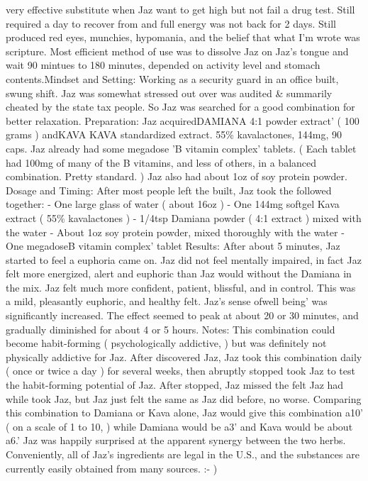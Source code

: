 \documentclass[12pt]{book}
\begin{document}
very effective substitute when Jaz want to get high but not fail a drug test. Still required a day to recover from and full energy was not back for 2 days. Still produced red eyes, munchies, hypomania, and the belief that what I'm wrote was scripture. Most efficient method of use was to dissolve Jaz on Jaz's tongue and wait 90 mintues to 180 minutes, depended on activity level and stomach contents.Mindset and Setting: Working as a security guard in an office built, swung shift. Jaz was somewhat stressed out over was audited \& summarily cheated by the state tax people. So Jaz was searched for a good combination for better relaxation. Preparation: Jaz acquiredDAMIANA 4:1 powder extract' ( 100 grams ) andKAVA KAVA standardized extract. 55\% kavalactones, 144mg, 90 caps. Jaz already had some megadose 'B vitamin complex' tablets. ( Each tablet had 100mg of many of the B vitamins, and less of others, in a balanced combination. Pretty standard. ) Jaz also had about 1oz of soy protein powder. Dosage and Timing: After most people left the built, Jaz took the followed together: - One large glass of water ( about 16oz ) - One 144mg softgel Kava extract ( 55\% kavalactones ) - 1/4tsp Damiana powder ( 4:1 extract ) mixed with the water - About 1oz soy protein powder, mixed thoroughly with the water - One megadoseB vitamin complex' tablet Results: After about 5 minutes, Jaz started to feel a euphoria came on. Jaz did not feel mentally impaired, in fact Jaz felt more energized, alert and euphoric than Jaz would without the Damiana in the mix. Jaz felt much more confident, patient, blissful, and in control. This was a mild, pleasantly euphoric, and healthy felt. Jaz's sense ofwell being' was significantly increased. The effect seemed to peak at about 20 or 30 minutes, and gradually diminished for about 4 or 5 hours. Notes: This combination could become habit-forming ( psychologically addictive, ) but was definitely not physically addictive for Jaz. After discovered Jaz, Jaz took this combination daily ( once or twice a day ) for several weeks, then abruptly stopped took Jaz to test the habit-forming potential of Jaz. After stopped, Jaz missed the felt Jaz had while took Jaz, but Jaz just felt the same as Jaz did before, no worse. Comparing this combination to Damiana or Kava alone, Jaz would give this combination a10' ( on a scale of 1 to 10, ) while Damiana would be a3' and Kava would be about a6.' Jaz was happily surprised at the apparent synergy between the two herbs. Conveniently, all of Jaz's ingredients are legal in the U.S., and the substances are currently easily obtained from many sources. :- )
\end{document}
